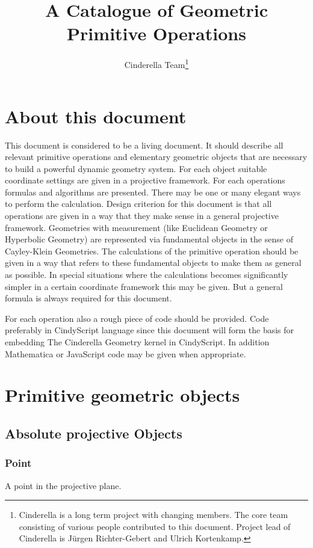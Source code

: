 \documentclass[11pt]{article}
\title{A Catalogue of Geometric Primitive Operations}
\author{
Cinderella Team\footnote{Cinderella is a long term project with changing members. The core team consisting of various people contributed to this document. Project lead of Cinderella is Jürgen Richter-Gebert and Ulrich Kortenkamp.}
} %
\date{}					%
\begin{document}
\maketitle

\thispagestyle{empty}

\section*{About this document}
This document is considered to be a living document. It should describe all relevant primitive operations and elementary geometric objects that are necessary to build a powerful dynamic geometry system. For each object suitable coordinate settings are given in a projective framework. For each operations formulas and algorithms are presented.
There may be one or many elegant ways to perform the calculation. Design criterion for this document is that all operations are given in a way that they make sense in a general projective framework. Geometries with measurement (like Euclidean Geometry or Hyperbolic Geometry) are represented via fundamental objects in the sense of Cayley-Klein Geometries. The calculations of the primitive operation should be given in a way that refers to these fundamental objects to make them as general as possible. In special situations where the calculations becomes significantly simpler in a certain coordinate framework this may be given. But a general formula is always required for this document.

For each operation also a rough piece of code should be provided. Code preferably in CindyScript language since this document will form the basis for embedding The Cinderella Geometry kernel 
in CindyScript. In addition Mathematica or JavaScript code may be given when appropriate.
\newpage

\section{Primitive geometric objects}

\subsection{Absolute projective Objects}
\subsubsection{Point}
 A point in the projective plane.
\end{document}
